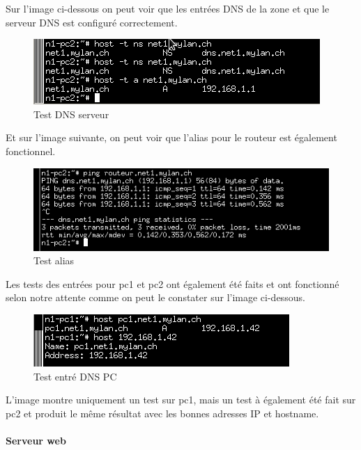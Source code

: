\documentclass{article}
\begin{document}
Sur l'image ci-dessous on peut voir que les entrées DNS de la zone et que le serveur DNS est configuré correctement.

\begin{figure}[!h]
	\centering
	\includegraphics{./captures/1-testrouteur-dns1-pc2.png}
	\caption{Test DNS serveur}
	\label{fig:Test DNS serveur}
\end{figure}

Et sur l'image suivante, on peut voir que l'alias pour le routeur est également fonctionnel.

\begin{figure}[!h]
	\centering
	\includegraphics{./captures/alias-routeur.png}
	\caption{Test alias}
	\label{fig:Test alias}
\end{figure}

Les tests des entrées pour pc1 et pc2 ont également été faits et ont fonctionné selon notre attente comme on peut le constater sur l'image ci-dessous.

\begin{figure}[!h]
	\centering
	\includegraphics{./captures/2-test-dns-pc1.png}
	\caption{Test entré DNS PC}
	\label{fig:Test entrées DNS pc}
\end{figure}

L'image montre uniquement un test sur pc1, mais un test à également été fait sur pc2 et produit le même résultat avec les bonnes adresses IP et hostname.

\paragraph{Serveur web}
\end{document}
